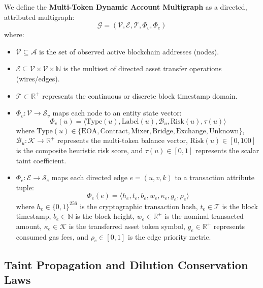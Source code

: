 We define the \textbf{Multi-Token Dynamic Account Multigraph} as a directed, attributed multigraph:
\begin{equation}
    \mathcal{G} = (\mathcal{V}, \mathcal{E}, \mathcal{T}, \Phi_v, \Phi_e)
\end{equation}
where:
\begin{itemize}
    \item $\mathcal{V} \subseteq \mathcal{A}$ is the set of observed active blockchain addresses (nodes).
    \item $\mathcal{E} \subseteq \mathcal{V} \times \mathcal{V} \times \mathbb{N}$ is the multiset of directed asset transfer operations (wires/edges).
    \item $\mathcal{T} \subset \mathbb{R}^+$ represents the continuous or discrete block timestamp domain.
    \item $\Phi_v: \mathcal{V} \to \mathcal{S}_v$ maps each node to an entity state vector:
    \begin{equation}
        \Phi_v(u) = \langle \text{Type}(u), \text{Label}(u), \mathcal{B}_u, \text{Risk}(u), \tau(u) \rangle
    \end{equation}
    where $\text{Type}(u) \in \{\text{EOA}, \text{Contract}, \text{Mixer}, \text{Bridge}, \text{Exchange}, \text{Unknown}\}$, $\mathcal{B}_u: \mathcal{K} \to \mathbb{R}^+$ represents the multi-token balance vector, $\text{Risk}(u) \in [0, 100]$ is the composite heuristic risk score, and $\tau(u) \in [0, 1]$ represents the scalar taint coefficient.
    \item $\Phi_e: \mathcal{E} \to \mathcal{S}_e$ maps each directed edge $e = (u, v, k)$ to a transaction attribute tuple:
    \begin{equation}
        \Phi_e(e) = \langle h_e, t_e, b_e, w_e, \kappa_e, g_e, \rho_e \rangle
    \end{equation}
    where $h_e \in \{0, 1\}^{256}$ is the cryptographic transaction hash, $t_e \in \mathcal{T}$ is the block timestamp, $b_e \in \mathbb{N}$ is the block height, $w_e \in \mathbb{R}^+$ is the nominal transacted amount, $\kappa_e \in \mathcal{K}$ is the transferred asset token symbol, $g_e \in \mathbb{R}^+$ represents consumed gas fees, and $\rho_e \in [0, 1]$ is the edge priority metric.
\end{itemize}

\subsection{Taint Propagation and Dilution Conservation Laws}

